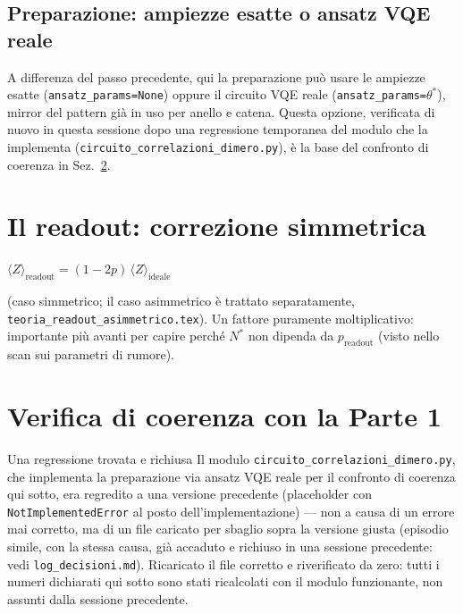\documentclass[11pt,a4paper]{article}
\begin{document}
\subsection{Preparazione: ampiezze esatte o ansatz VQE reale}
\label{sec:ansatz-params}

A differenza del passo precedente, qui la preparazione può usare le
ampiezze esatte (\texttt{ansatz\_params=None}) oppure il circuito VQE
reale (\texttt{ansatz\_params=$\theta^*$}), mirror del pattern già in uso
per anello e catena. Questa opzione, verificata di nuovo in questa
sessione dopo una regressione temporanea del modulo che la implementa
(\texttt{circuito\_correlazioni\_dimero.py}), è la base del confronto di
coerenza in Sez.~\ref{sec:verifica-coerenza}.

\section{Il readout: correzione simmetrica}

\begin{keyeq}
\centering
$\langle Z\rangle_\text{readout} = (1-2p)\,\langle Z\rangle_\text{ideale}$
\end{keyeq}
(caso simmetrico; il caso asimmetrico è trattato separatamente,
\texttt{teoria\_readout\_asimmetrico.tex}). Un fattore puramente
moltiplicativo: importante più avanti per capire perché $N^*$ non dipenda
da $p_\text{readout}$ (visto nello scan sui parametri di rumore).

\section{Verifica di coerenza con la Parte 1}
\label{sec:verifica-coerenza}

\begin{warnbox}{Una regressione trovata e richiusa}
Il modulo \texttt{circuito\_correlazioni\_dimero.py}, che implementa la
preparazione via ansatz VQE reale per il confronto di coerenza qui sotto,
era regredito a una versione precedente (placeholder con
\texttt{NotImplementedError} al posto dell'implementazione) --- non a
causa di un errore mai corretto, ma di un file caricato per sbaglio sopra
la versione giusta (episodio simile, con la stessa causa, già accaduto e
richiuso in una sessione precedente: vedi \texttt{log\_decisioni.md}).
Ricaricato il file corretto e riverificato da zero: tutti i numeri
dichiarati qui sotto sono stati ricalcolati con il modulo funzionante,
non assunti dalla sessione precedente.
\end{warnbox}
\end{document}

